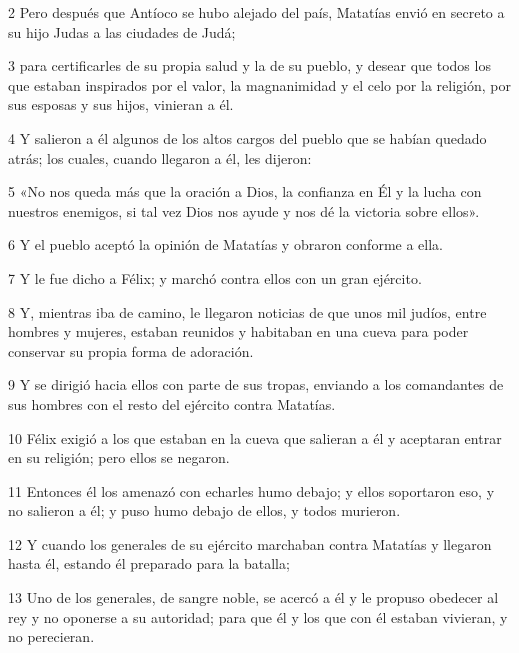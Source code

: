\par 2 Pero después que Antíoco se hubo alejado del país, Matatías envió en secreto a su hijo Judas a las ciudades de Judá;

\par 3 para certificarles de su propia salud y la de su pueblo, y desear que todos los que estaban inspirados por el valor, la magnanimidad y el celo por la religión, por sus esposas y sus hijos, vinieran a él.

\par 4 Y salieron a él algunos de los altos cargos del pueblo que se habían quedado atrás; los cuales, cuando llegaron a él, les dijeron:

\par 5 «No nos queda más que la oración a Dios, la confianza en Él y la lucha con nuestros enemigos, si tal vez Dios nos ayude y nos dé la victoria sobre ellos».

\par 6 Y el pueblo aceptó la opinión de Matatías y obraron conforme a ella.

\par 7 Y le fue dicho a Félix; y marchó contra ellos con un gran ejército.

\par 8 Y, mientras iba de camino, le llegaron noticias de que unos mil judíos, entre hombres y mujeres, estaban reunidos y habitaban en una cueva para poder conservar su propia forma de adoración.

\par 9 Y se dirigió hacia ellos con parte de sus tropas, enviando a los comandantes de sus hombres con el resto del ejército contra Matatías.

\par 10 Félix exigió a los que estaban en la cueva que salieran a él y aceptaran entrar en su religión; pero ellos se negaron.

\par 11 Entonces él los amenazó con echarles humo debajo; y ellos soportaron eso, y no salieron a él; y puso humo debajo de ellos, y todos murieron.

\par 12 Y cuando los generales de su ejército marchaban contra Matatías y llegaron hasta él, estando él preparado para la batalla;

\par 13 Uno de los generales, de sangre noble, se acercó a él y le propuso obedecer al rey y no oponerse a su autoridad; para que él y los que con él estaban vivieran, y no perecieran.

